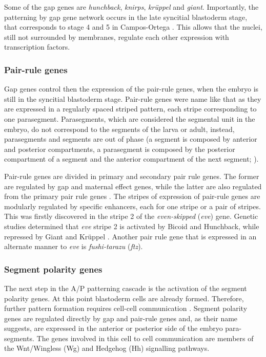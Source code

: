 Some of the gap genes are \textit{hunchback}, \textit{knirps}, \textit{kr\"{u}ppel} and \textit{giant}.
Importantly, the patterning by gap gene network occurs in the late syncitial blastoderm stage, that corresponds to stage 4 and 5 in Campos-Ortega \citep{Campos-Ortega1985}.
This allows that the nuclei, still not surrounded by membranes, regulate each other expression with transcription factors.

\subsubsection{Pair-rule genes}

Gap genes control then the expression of the pair-rule genes, when the embryo is still in the syncitial blastoderm stage. 
Pair-rule genes were name like that as they are expressed in a regularly spaced striped pattern, each stripe corresponding to one parasegment.
Parasegments, which are considered the segmental unit in the embryo, do not correspond to the segments of the larva or adult, instead, parasegments and segments are out of phase (a segment is composed by anterior and posterior compartments, a parasegment is composed by the posterior compartment of a segment and the anterior compartment of the next segment; \citealp{lawrence1992making,Arias2008}).

Pair-rule genes are divided in primary and secondary pair rule genes. The former are regulated by gap and maternal effect genes, while the latter are also regulated from the primary pair
rule genes \citep{Chipman2015}.
The stripes of expression of pair-rule genes are modularly regulated by specific enhancers, each for one stripe or a pair of stripes.
This was firstly discovered in the stripe 2 of the \textit{even-skipped} (\textit{eve}) gene. 
Genetic studies determined that \textit{eve} stripe 2 is activated by Bicoid and Hunchback, while repressed by Giant and Kr\"{u}ppel \citep{Small1991,Stanojevic1991}.
Another pair rule gene that is expressed in an alternate manner to \textit{eve} is \textit{fushi-tarazu} (\textit{ftz}).


\subsubsection{Segment polarity genes}

The next step in the A/P patterning cascade is the activation of the segment polarity genes.
At this point blastoderm cells are already formed. Therefore, further pattern formation requires cell-cell communication \citep{Gilbert2014}.
Segment polarity genes are regulated directly by gap and pair-rule genes and, as their name suggests, are expressed in the anterior or posterior side of the embryo para-segments.
The genes involved in this cell to cell communication are members of the Wnt/Wingless (Wg) and Hedgehog (Hh) signalling pathways.

